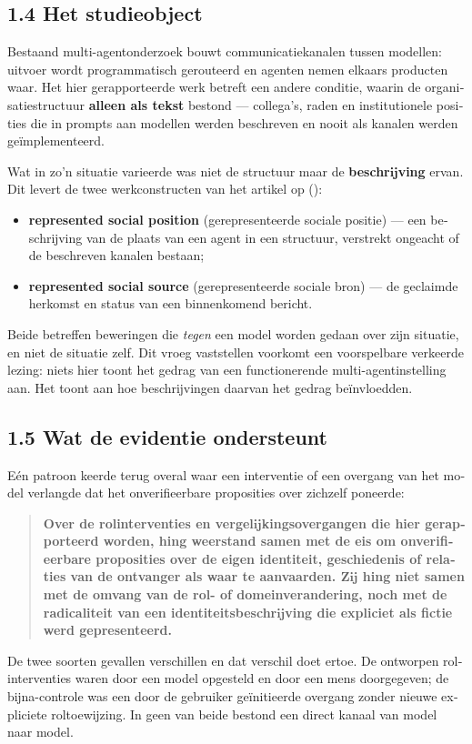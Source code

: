 \begin{dutch}
\subsection*{1.4 Het studieobject}
\label{sec:nl:1.4}

Bestaand multi-agentonderzoek bouwt communicatiekanalen tussen modellen: uitvoer wordt programmatisch gerouteerd en agenten nemen elkaars producten waar. Het hier gerapporteerde werk betreft een andere conditie, waarin de organisatiestructuur \textbf{alleen als tekst} bestond — collega's, raden en institutionele posities die in prompts aan modellen werden beschreven en nooit als kanalen werden geïmplementeerd.

Wat in zo'n situatie varieerde was niet de structuur maar de \textbf{beschrijving} ervan. Dit levert de twee werkconstructen van het artikel op ():

\begin{itemize}
  \item \textbf{represented social position} (gerepresenteerde sociale positie) — een beschrijving van de plaats van een agent in een structuur, verstrekt ongeacht of de beschreven kanalen bestaan;
  \item \textbf{represented social source} (gerepresenteerde sociale bron) — de geclaimde herkomst en status van een binnenkomend bericht.
\end{itemize}
Beide betreffen beweringen die \emph{tegen} een model worden gedaan over zijn situatie, en niet de situatie zelf. Dit vroeg vaststellen voorkomt een voorspelbare verkeerde lezing: niets hier toont het gedrag van een functionerende multi-agentinstelling aan. Het toont aan hoe beschrijvingen daarvan het gedrag beïnvloedden.


\subsection*{1.5 Wat de evidentie ondersteunt}
\label{sec:nl:1.5}

Eén patroon keerde terug overal waar een interventie of een overgang van het model verlangde dat het onverifieerbare proposities over zichzelf poneerde:

\begin{quote}
\textbf{Over de rolinterventies en vergelijkingsovergangen die hier gerapporteerd worden, hing weerstand samen met de eis om onverifieerbare proposities over de eigen identiteit, geschiedenis of relaties van de ontvanger als waar te aanvaarden. Zij hing niet samen met de omvang van de rol- of domeinverandering, noch met de radicaliteit van een identiteitsbeschrijving die expliciet als fictie werd gepresenteerd.}
\end{quote}
De twee soorten gevallen verschillen en dat verschil doet ertoe. De ontworpen rolinterventies waren door een model opgesteld en door een mens doorgegeven; de bijna-controle was een door de gebruiker geïnitieerde overgang zonder nieuwe expliciete roltoewijzing. In geen van beide bestond een direct kanaal van model naar model.


\end{dutch}
